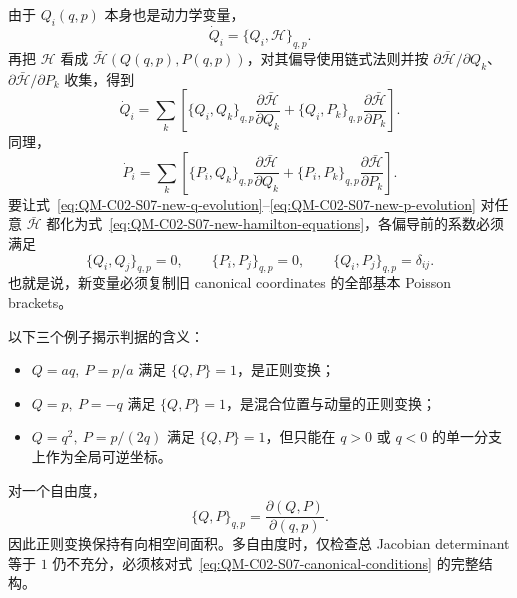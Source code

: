 由于 $Q_i(q,p)$ 本身也是动力学变量，
\[
  \dot Q_i=\{Q_i,\mathcal H\}_{q,p}.
\]
再把 $\mathcal H$ 看成 $\bar{\mathcal H}(Q(q,p),P(q,p))$，对其偏导使用链式法则并按 $\partial\bar{\mathcal H}/\partial Q_k$、$\partial\bar{\mathcal H}/\partial P_k$ 收集，得到
\begin{equation}
  \dot Q_i
  =\sum_k\left[
    \{Q_i,Q_k\}_{q,p}
    \frac{\partial\bar{\mathcal H}}{\partial Q_k}
    +
    \{Q_i,P_k\}_{q,p}
    \frac{\partial\bar{\mathcal H}}{\partial P_k}
  \right].
  \label{eq:QM-C02-S07-new-q-evolution}
\end{equation}
同理，
\begin{equation}
  \dot P_i
  =\sum_k\left[
    \{P_i,Q_k\}_{q,p}
    \frac{\partial\bar{\mathcal H}}{\partial Q_k}
    +
    \{P_i,P_k\}_{q,p}
    \frac{\partial\bar{\mathcal H}}{\partial P_k}
  \right].
  \label{eq:QM-C02-S07-new-p-evolution}
\end{equation}
要让式~\eqref{eq:QM-C02-S07-new-q-evolution}--\eqref{eq:QM-C02-S07-new-p-evolution} 对任意 $\bar{\mathcal H}$ 都化为式~\eqref{eq:QM-C02-S07-new-hamilton-equations}，各偏导前的系数必须满足
\begin{equation}
  \boxed{
  \{Q_i,Q_j\}_{q,p}=0,
  \qquad
  \{P_i,P_j\}_{q,p}=0,
  \qquad
  \{Q_i,P_j\}_{q,p}=\delta_{ij}.}
  \label{eq:QM-C02-S07-canonical-conditions}
\end{equation}
也就是说，新变量必须复制旧 canonical coordinates 的全部基本 Poisson brackets。

以下三个例子揭示判据的含义：
\begin{itemize}[leftmargin=*]
  \item $Q=aq,\ P=p/a$ 满足 $\{Q,P\}=1$，是正则变换；
  \item $Q=p,\ P=-q$ 满足 $\{Q,P\}=1$，是混合位置与动量的正则变换；
  \item $Q=q^2,\ P=p/(2q)$ 满足 $\{Q,P\}=1$，但只能在 $q>0$ 或 $q<0$ 的单一分支上作为全局可逆坐标。
\end{itemize}
对一个自由度，
\begin{equation}
  \{Q,P\}_{q,p}
  =\frac{\partial(Q,P)}{\partial(q,p)}.
  \label{eq:QM-C02-S07-one-dimensional-jacobian}
\end{equation}
因此正则变换保持有向相空间面积。多自由度时，仅检查总 Jacobian determinant 等于 $1$ 仍不充分，必须核对式~\eqref{eq:QM-C02-S07-canonical-conditions} 的完整结构。

